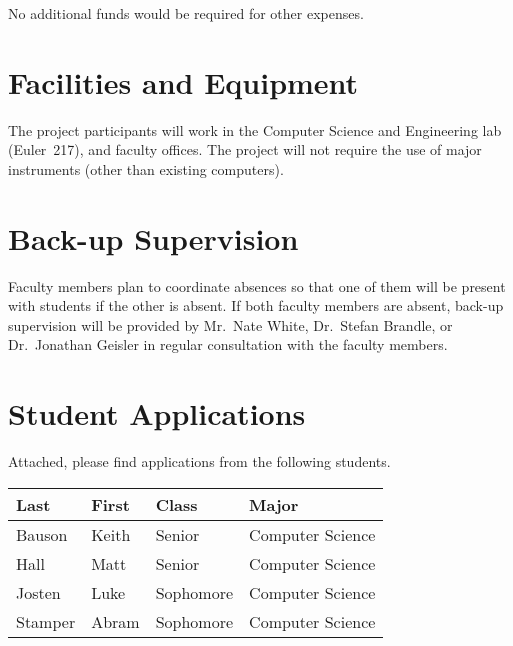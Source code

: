 \documentclass{article}
\begin{document}
No additional funds would be required for other expenses.

\section{Facilities and Equipment}
\label{sec:facilities-equipment}


The project participants will work in
the Computer Science and Engineering lab (Euler~217), and
faculty offices.
The project will not require the use of major instruments
(other than existing computers).

\section{Back-up Supervision}
\label{sec:back-up-supervision}


Faculty members plan to coordinate absences
so that one of them will be present with students if the other is absent.
If both faculty members are absent,
back-up supervision will be provided by
Mr.\ Nate White,
Dr.\ Stefan Brandle, or
Dr.\ Jonathan Geisler
in regular consultation with the faculty members.

\appendix

\section{Student Applications}
\label{sec:student-applications}

Attached, please find applications from the following students.

\begin{center}
  \begin{tabular}{llll}
    \toprule
    Last    & First & Class     & Major            \\
    \midrule
    Bauson  & Keith & Senior    & Computer Science \\
    Hall    & Matt  & Senior    & Computer Science \\
    Josten  & Luke  & Sophomore & Computer Science \\
    Stamper & Abram & Sophomore & Computer Science \\
    \bottomrule
  \end{tabular}
\end{center}





\end{document}
